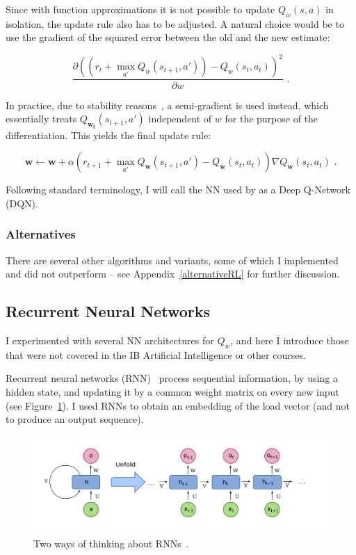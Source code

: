 Since with function approximations it is not possible to update $Q_w(s, a)$ in isolation, the update rule also has to be adjusted. A natural choice would be to use the gradient of the squared error between the old and the new estimate:

$$\frac{\partial (( r_t + \max_{a'} Q_w(s_{t+1}, a')) - Q_w(s_t,a_t))^2}{\partial w} \text{ .}$$

In practice, due to stability reasons~\cite{barnard1993semigradient}, a semi-gradient is used instead, which essentially treats $Q_{\mathbf{w_t}}(s_{t+1}, a')$ independent of $w$ for the purpose of the differentiation. This yields the final update rule:


\begin{equation} \label{eq:deep-q-learning-update-with-semi-gradient}
\mathbf{w} \leftarrow \mathbf{w} + \alpha\left( r_{t+1}+ \max_{a'} Q_{\mathbf{w}}(s_{t+1}, a') - Q_{\mathbf{w}}(s_t,a_t)\right)\nabla Q_{\mathbf{w}}(s_{t}, a_t) \text{ .}
\end{equation}

Following standard terminology, I will call the NN used by \DQL as a Deep Q-Network (DQN).

\subsubsection*{Alternatives}

There are several other algorithms and variants, some of which I implemented and did not outperform \DQL -- see Appendix~\ref{alternativeRL} for further discussion.


\subsection{Recurrent Neural Networks} \label{RNN}


I experimented with several NN architectures for $Q_w$, and here I introduce those that were not covered in the IB Artificial Intelligence or other courses.

Recurrent neural networks (RNN)~\cite{hopfield1982RNNoriginal} process sequential information, by using a hidden state, and updating it by a common weight matrix on every new input (see Figure~\ref{RNN-image}). I used RNNs to obtain an embedding of the load vector (and not to produce an output sequence).

\begin{figure}[h]
    \centering
    \includegraphics[scale=0.2]{Chapter2/Figs/RNN.png}
    \caption{Two ways of thinking about RNNs~\cite{RNN}.}
     \label{RNN-image}
\end{figure}


